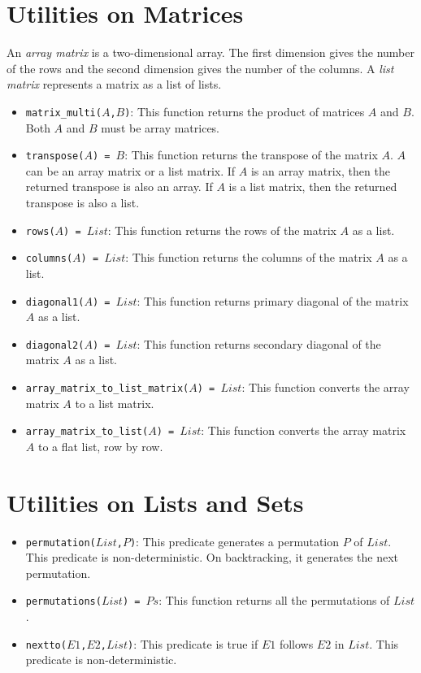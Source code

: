 \section{Utilities on Matrices}
An {\it array matrix} is a two-dimensional array. The first dimension gives the number of the rows and the second dimension gives the number of the columns. A {\it list matrix} represents a matrix as a list of lists.

\begin{itemize}
\item \texttt{matrix\_multi($A$,$B$)}: This function returns the product of matrices $A$ and $B$. Both $A$ and $B$ must be array matrices.
\item \texttt{transpose($A$) = $B$}: This function returns the transpose of the matrix $A$. $A$ can be an array matrix or a list matrix. If $A$ is an array matrix, then the returned transpose is also an array. If $A$ is a list matrix, then the returned transpose is also a list.
\item \texttt{rows($A$) = $List$}: This function returns the rows of the matrix $A$ as a list.
\item \texttt{columns($A$) = $List$}: This function returns the columns of the matrix $A$ as a list.
\item \texttt{diagonal1($A$) = $List$}: This function returns primary diagonal of the matrix $A$ as a list.
\item \texttt{diagonal2($A$) = $List$}: This function returns secondary diagonal of the matrix $A$ as a list.
\item \texttt{array\_matrix\_to\_list\_matrix($A$) = $List$}: This function converts the array matrix $A$ to a list matrix.
\item \texttt{array\_matrix\_to\_list($A$) = $List$}: This function converts the array matrix $A$ to a flat list, row by row.
\end{itemize}

\section{Utilities on Lists and Sets}
\begin{itemize}
\item \texttt{permutation($List$,$P$)}: This predicate generates a permutation $P$ of $List$. This predicate is non-deterministic. On backtracking, it generates the next permutation.
\item \texttt{permutations($List$) = $Ps$}: This function returns all the permutations of $List$.
\item \texttt{nextto($E1$,$E2$,$List$)}: This predicate is true if \texttt{$E1$} follows \texttt{$E2$} in \texttt{$List$}. This predicate is non-deterministic.
\end{itemize}

\ignore{

}
